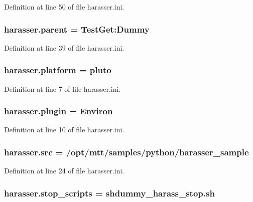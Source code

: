 Definition at line 50 of file harasser.\-ini.

\hypertarget{namespaceharasser_af9d9d7cb6a6d68880aeec6ccfa16ca23}{
\subsubsection[{parent}]{\setlength{\rightskip}{0pt plus 5cm}harasser.\-parent = Test\-Get\-:\-Dummy}}\label{namespaceharasser_af9d9d7cb6a6d68880aeec6ccfa16ca23}


Definition at line 39 of file harasser.\-ini.

\hypertarget{namespaceharasser_aa827937946f071c462edd50adeffbf99}{
\subsubsection[{platform}]{\setlength{\rightskip}{0pt plus 5cm}harasser.\-platform = pluto}}\label{namespaceharasser_aa827937946f071c462edd50adeffbf99}


Definition at line 7 of file harasser.\-ini.

\hypertarget{namespaceharasser_af41bea3324a7007e30dccbc1526e63b2}{
\subsubsection[{plugin}]{\setlength{\rightskip}{0pt plus 5cm}harasser.\-plugin = Environ}}\label{namespaceharasser_af41bea3324a7007e30dccbc1526e63b2}


Definition at line 10 of file harasser.\-ini.

\hypertarget{namespaceharasser_a5cb1fdd5bdc77091984dbf7901fd7e00}{
\subsubsection[{src}]{\setlength{\rightskip}{0pt plus 5cm}harasser.\-src = /opt/mtt/samples/python/harasser\-\_\-sample}}\label{namespaceharasser_a5cb1fdd5bdc77091984dbf7901fd7e00}


Definition at line 24 of file harasser.\-ini.

\hypertarget{namespaceharasser_acf2bbc7d9fff08e2232c16a79b0e72f4}{
\subsubsection[{stop\-\_\-scripts}]{\setlength{\rightskip}{0pt plus 5cm}harasser.\-stop\-\_\-scripts = shdummy\-\_\-harass\-\_\-stop.\-sh}}\label{namespaceharasser_acf2bbc7d9fff08e2232c16a79b0e72f4}


